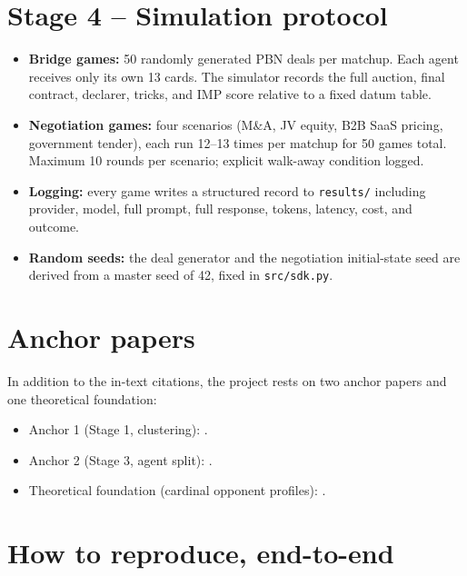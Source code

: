 \documentclass[11pt, a4paper, oneside, openany]{report}
\begin{document}
\section{Stage 4 -- Simulation protocol}

\begin{itemize}[leftmargin=*]
    \item \textbf{Bridge games:} 50 randomly generated PBN deals per matchup. Each agent receives only its own 13 cards. The simulator records the full auction, final contract, declarer, tricks, and IMP score relative to a fixed datum table.
    \item \textbf{Negotiation games:} four scenarios (M\&A, JV equity, B2B SaaS pricing, government tender), each run 12--13 times per matchup for 50 games total. Maximum 10 rounds per scenario; explicit walk-away condition logged.
    \item \textbf{Logging:} every game writes a structured record to \texttt{results/} including provider, model, full prompt, full response, tokens, latency, cost, and outcome.
    \item \textbf{Random seeds:} the deal generator and the negotiation initial-state seed are derived from a master seed of 42, fixed in \texttt{src/sdk.py}.
\end{itemize}

\section{Anchor papers}

In addition to the in-text citations, the project rests on two anchor papers and one theoretical foundation:

\begin{itemize}[leftmargin=*]
    \item Anchor 1 (Stage 1, clustering): \citet{talwadker2022cognitionnet}.
    \item Anchor 2 (Stage 3, agent split): \citet{rong2019competitive}.
    \item Theoretical foundation (cardinal opponent profiles): \citet{lockett2007evolving}.
\end{itemize}

\section{How to reproduce, end-to-end}
\end{document}
